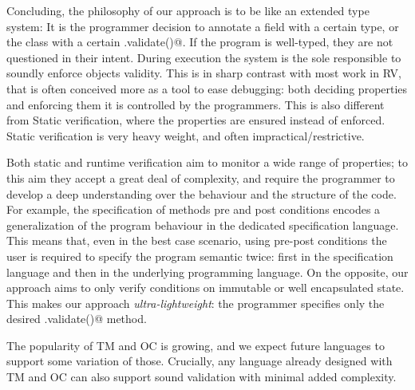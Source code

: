 
\loseSpace
\noindent Concluding, 
the philosophy of our approach is to be like an extended type system: 
It is the programmer decision
to annotate a field with a certain type,
or the class with a certain \Q@.validate()@.
If the program is well-typed, they are not questioned in their intent.
During execution the system is the sole responsible to soundly enforce objects validity.
This is in sharp contrast with most work in RV, that is often conceived more as a tool to ease debugging:
both deciding properties and enforcing them it is controlled by the programmers.
This is also different from Static verification,
where the properties are ensured instead of enforced.
Static verification is very heavy weight, and often impractical/restrictive.

Both static and runtime verification
aim to monitor a wide range of properties; to this aim they accept a 
great deal of complexity, and require the programmer to develop a deep understanding
over the behaviour and the structure of the code.
For example, the specification of methods pre and post conditions
encodes a generalization of the program behaviour in the dedicated specification language.
This means that, even in the best case scenario, 
using pre-post conditions the user is required to specify the program semantic twice:
first in the specification language and then in the underlying programming language.
On the opposite, our approach aims to only verify conditions on immutable or well encapsulated state.
This makes our approach \emph{ultra-lightweight}:
the programmer specifies only the desired \Q@.validate()@ method.

The popularity of TM and OC is growing, and we expect future languages to support some variation of those.
Crucially, any language already designed with TM and OC
can also support sound validation with minimal added complexity.